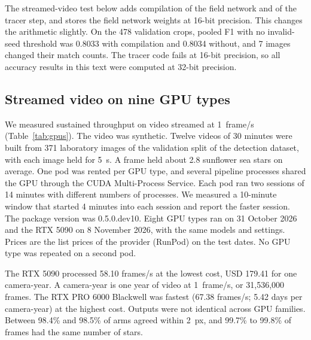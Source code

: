 The streamed-video test below adds compilation of the field network and of the tracer step, and stores the field network weights at 16-bit precision.
This changes the arithmetic slightly.
On the 478 validation crops, pooled F1 with no invalid-seed threshold was 0.8033 with compilation and 0.8034 without, and 7 images changed their match counts.
The tracer code fails at 16-bit precision, so all accuracy results in this text were computed at 32-bit precision.

\subsection*{Streamed video on nine GPU types}

We measured sustained throughput on video streamed at 1~frame/s (Table~\ref{tab:gpus}).
The video was synthetic.
Twelve videos of 30 minutes were built from 371 laboratory images of the validation split of the detection dataset, with each image held for 5~s.
A frame held about 2.8 sunflower sea stars on average.
One pod was rented per GPU type, and several pipeline processes shared the GPU through the CUDA Multi-Process Service.
Each pod ran two sessions of 14 minutes with different numbers of processes.
We measured a 10-minute window that started 4 minutes into each session and report the faster session.
The package version was 0.5.0.dev10.
Eight GPU types ran on 31 October 2026 and the RTX 5090 on 8 November 2026, with the same models and settings.
Prices are the list prices of the provider (RunPod) on the test dates.
No GPU type was repeated on a second pod.

The RTX 5090 processed 58.10 frames/s at the lowest cost, USD 179.41 for one camera-year.
A camera-year is one year of video at 1~frame/s, or 31,536,000 frames.
The RTX PRO 6000 Blackwell was fastest (67.38 frames/s; 5.42 days per camera-year) at the highest cost.
Outputs were not identical across GPU families.
Between 98.4\% and 98.5\% of arms agreed within 2~px, and 99.7\% to 99.8\% of frames had the same number of stars.


